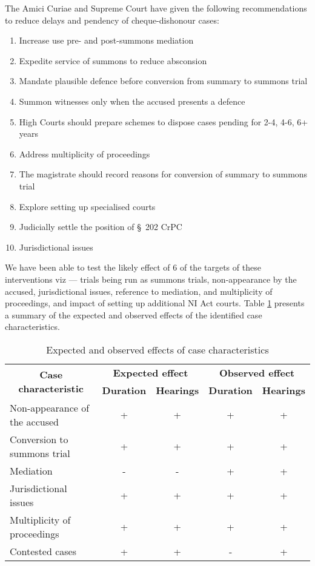 The Amici Curiae and Supreme Court have given the following recommendations to reduce delays and pendency of cheque-dishonour cases:
\begin{enumerate}
\item Increase use pre- and post-summons mediation
\item Expedite service of summons to reduce absconsion
\item Mandate plausible defence before conversion from summary to summons trial
\item Summon witnesses only when the accused presents a defence
\item High Courts should prepare schemes to dispose cases pending for 2-4, 4-6, 6+ years
\item Address multiplicity of proceedings
\item The magistrate should record reasons for conversion of summary to summons trial
\item Explore setting up specialised courts
\item Judicially settle the position of \S~202 CrPC
\item Jurisdictional issues
\end{enumerate}

We have been able to test the likely effect of 6 of the targets of these interventions viz --- trials being run as summons trials, non-appearance by the accused, jurisdictional issues, reference to mediation, and multiplicity of proceedings, and impact of setting up additional NI Act courts. Table \ref{tab:observed} presents a summary of the expected and observed effects of the identified case characteristics.

\begin{longtable}{@{}lcc|cc@{}}
\caption{Expected and observed effects of case characteristics}
\label{tab:observed}\\
\toprule
\multicolumn{1}{c}{\multirow{2}{*}{\textbf{Case characteristic}}} & \multicolumn{2}{c}{\textbf{Expected effect}} & \multicolumn{2}{c}{\textbf{Observed effect}} \\ \cmidrule(l){2-5}
\multicolumn{1}{c}{} & \textbf{Duration} & \textbf{Hearings} & \textbf{Duration} & \textbf{Hearings}\\ \midrule
Non-appearance of the accused & + & + & + & + \\
Conversion to summons trial & + & + & + & +\\
Mediation & - & - & + & + \\
Jurisdictional issues & + & + & + & + \\
Multiplicity of proceedings & + & + & + & +\\
Contested cases & + & + & - & +\\ \bottomrule
\end{longtable}


